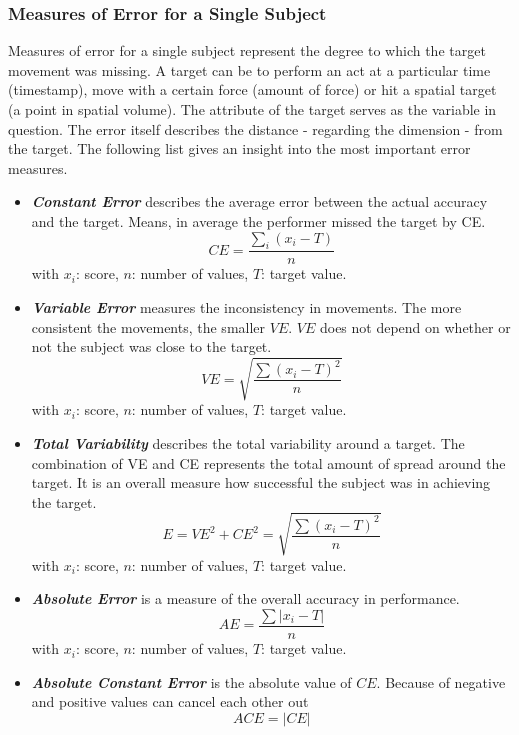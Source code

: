 \subsubsection{Measures of Error for a Single Subject}
Measures of error for a single subject represent the degree to which the target movement was missing. A target can be to perform an act at a particular time (timestamp), move with a certain force (amount of force) or hit a spatial target (a point in spatial volume). The attribute of the target serves as the variable in question. The error itself describes the distance - regarding the dimension - from the target. The following list gives an insight into the most important error measures.
\begin{itemize}
	\item \textbf{\textit{Constant Error}} describes the average error between the actual accuracy and the target. Means, in average the performer missed the target by CE.
	\begin{equation}
	\label{eq:constanterror}
	CE=\frac{\sum_i(x_i-T)}{n}
	\end{equation}
	with $x_i$: score, $n$: number of values, $T$: target value.
	\item \textbf{\textit{Variable Error}} measures the inconsistency in movements. The more consistent the movements, the smaller $VE$. $VE$ does not depend on whether or not the subject was close to the target.
	\begin{equation}
	VE=\sqrt{\frac{\sum(x_i-T)^2}{n}}    
	\end{equation}
	with $x_i$: score, $n$: number of values, $T$: target value.
	\item \textbf{\textit{Total Variability}} describes the total variability around a target. The combination of VE and CE represents the total amount of spread around the target. It is an overall measure how successful the subject was in achieving the target.
	\begin{equation}
	E=VE^2+CE^2=\sqrt{\frac{\sum(x_i-T)^2}{n}}
	\end{equation}
	with $x_i$: score, $n$: number of values, $T$: target value.
	\item \textbf{\textit{Absolute Error}} is a measure of the overall accuracy in performance.
	\begin{equation}
	AE=\frac{\sum|x_i-T|}{n}
	\end{equation}
	with $x_i$: score, $n$: number of values, $T$: target value.
	\item \textbf{\textit{Absolute Constant Error}} is the absolute value of $CE$. Because of negative and positive values can cancel each other out
	\begin{equation}
	ACE = |CE|
	\end{equation}
\end{itemize}



